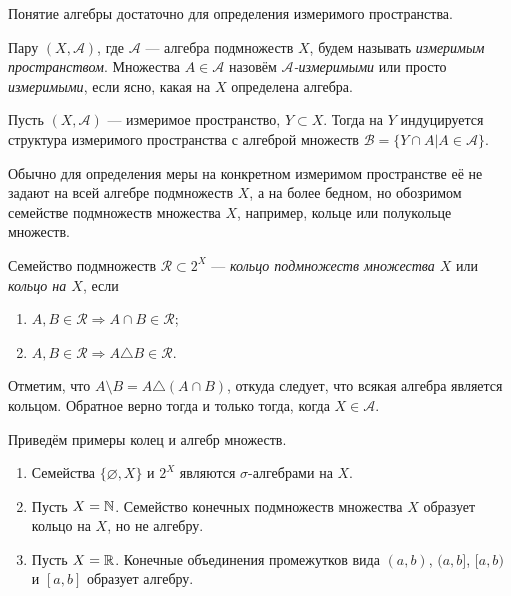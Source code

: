 Понятие алгебры достаточно для определения измеримого пространства.
\begin{defin}
	Пару $(X,\mathcal{A})$, где $\mathcal{A}$ --- алгебра подмножеств $X$, будем называть \textit{измеримым пространством}. Множества $A\in\mathcal{A}$ назовём \textit{$\mathcal{A}$-измеримыми} или просто \textit{измеримыми}, если ясно, какая на $X$ определена алгебра.
\end{defin}
\begin{defin}
	Пусть $(X,\mathcal{A})$ --- измеримое пространство, $Y\subset X$. Тогда на $Y$ индуцируется структура измеримого пространства с алгеброй множеств $\mathcal{B}=\{Y\cap A|A\in\mathcal{A}\}$.
\end{defin}

Обычно для определения меры на конкретном измеримом пространстве её не задают на всей алгебре подмножеств $X$, а на более бедном, но обозримом семействе подмножеств множества $X$, например, кольце или полукольце множеств.
\begin{defin}
	Семейство подмножеств $\mathcal{R}\subset 2^X$ --- \textit{кольцо подмножеств множества $X$} или \textit{кольцо на $X$}, если
	\begin{enumerate}
		\item $A,B\in\mathcal{R}\Rightarrow A\cap B\in\mathcal{R}$;
		\item $A,B\in\mathcal{R}\Rightarrow A\triangle B\in\mathcal{R}$.
	\end{enumerate}
\end{defin}
Отметим, что $A\setminus B=A\triangle(A\cap B)$, откуда следует, что всякая алгебра является кольцом. Обратное верно тогда и только тогда, когда $X\in\mathcal{A}$.

Приведём примеры колец и алгебр множеств.
\begin{enumerate}
	\item Семейства $\{\varnothing, X\}$ и $2^X$ являются $\sigma$-алгебрами на $X$.
	\item Пусть $X=\mathbb {N}$. Семейство конечных подмножеств множества $X$ образует кольцо на $X$, но не алгебру.
	\item Пусть $X=\mathbb {R}$. Конечные объединения промежутков вида $(a,b)$, $(a,b]$, $[a,b)$ и $[a,b]$ образует алгебру.
\end{enumerate}

